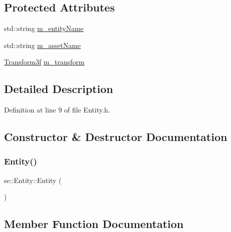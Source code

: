 \subsection*{Protected Attributes}
\begin{DoxyCompactItemize}
\item 
std\+::string \mbox{\hyperlink{classse_1_1_entity_ad4e3cc82e88be87565d00fdf10c18b12}{m\+\_\+entity\+Name}}
\item 
std\+::string \mbox{\hyperlink{classse_1_1_entity_aba1f7cc3700caee65b20c423185ab7ca}{m\+\_\+asset\+Name}}
\item 
\mbox{\hyperlink{classse_1_1_transform3f}{Transform3f}} \mbox{\hyperlink{classse_1_1_entity_a85a408963ce0920c7bc3bfec29266238}{m\+\_\+transform}}
\end{DoxyCompactItemize}


\subsection{Detailed Description}


Definition at line 9 of file Entity.\+h.



\subsection{Constructor \& Destructor Documentation}
\mbox{\label{classse_1_1_entity_ac92492302d50c22ba7c4e9ff016b6145}} 
\subsubsection{\texorpdfstring{Entity()}{Entity()}}
{\footnotesize\ttfamily se\+::\+Entity\+::\+Entity (\begin{DoxyParamCaption}{ }\end{DoxyParamCaption})}



\subsection{Member Function Documentation}
\mbox{\label{classse_1_1_entity_af1d512cba984ffe167decd7ecf7a88f4}} 
